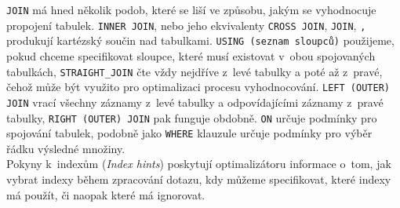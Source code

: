 \texttt{JOIN} má hned několik podob, které se liší ve způsobu, jakým se vyhodnocuje propojení tabulek. 
\texttt{INNER JOIN}, nebo jeho ekvivalenty \texttt{CROSS JOIN}, \texttt{JOIN}, \texttt{,} produkují kartézský součin nad tabulkami.
\texttt{USING (seznam sloupců)} použijeme, pokud chceme specifikovat sloupce, které musí existovat v~obou spojovaných tabulkách,
\texttt{STRAIGHT\_JOIN} čte vždy nejdříve z~levé tabulky a poté až z~pravé, čehož může být využito pro optimalizaci procesu vyhodnocování.
\texttt{LEFT (OUTER) JOIN} vrací všechny záznamy z~levé tabulky a odpovídajícími záznamy z~pravé tabulky,
\texttt{RIGHT (OUTER) JOIN} pak funguje obdobně.
\texttt{ON} určuje podmínky pro spojování tabulek, podobně jako \texttt{WHERE} klauzule určuje podmínky pro výběr řádku
výsledné množiny. \\

Pokyny k~indexům (\textit{Index hints}) poskytují optimalizátoru informace o~tom, jak vybrat indexy během zpracování dotazu,
kdy můžeme specifikovat, které indexy má použít, či naopak které má ignorovat. \\


